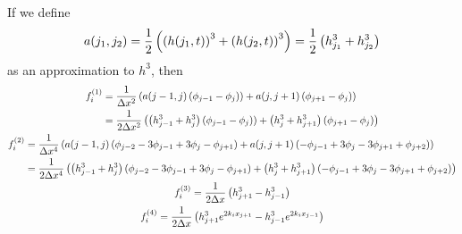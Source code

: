 If we define 
\begin{equation*}
    a\!\left( j_1, j_2 \right) = \frac{1}{2} \left( \left( h\!\left( j_1, t \right) \right)^3 + \left( h\!\left( j_2, t \right) \right)^3 \right) = \frac{1}{2} \left( h_{j_1}^3 + h_{j_2}^3 \right)
\end{equation*}
as an approximation to $h^3$, then 
\begin{gather*}
\begin{aligned}
    f_i^{(1)} &= \frac{1}{\Delta x^2} \left( a\!\left( j-1, j \right)\left( \phi_{j-1} - \phi_{j}) \right) + a\!\left( j, j+1 \right)\left( \phi_{j+1} - \phi_{j} \right) \right)\\
    &= \frac{1}{2\Delta x^2} \left( \left( h_{j-1}^3 + h_{j}^3 \right)\left( \phi_{j-1} - \phi_{j}) \right) + \left( h_{j}^3 + h_{j+1}^3 \right)\left( \phi_{j+1} - \phi_{j} \right) \right)
\end{aligned}\\
\begin{aligned}
    f_i^{(2)} &= \frac{1}{\Delta x^4} \left( a\!\left( j-1, j \right)\left( \phi_{j-2} - 3\phi_{j-1} + 3\phi_{j} - \phi_{j+1} \right) + a\!\left( j, j+1 \right)\left( -\phi_{j-1} + 3\phi_{j} - 3\phi_{j+1} + \phi_{j+2} \right) \right)\\
    &= \frac{1}{2\Delta x^4} \left( \left( h_{j-1}^3 + h_{j}^3 \right) \left( \phi_{j-2} - 3\phi_{j-1} + 3\phi_{j} - \phi_{j+1} \right) + \left( h_{j}^3 + h_{j+1}^3 \right) \left( -\phi_{j-1} + 3\phi_{j} - 3\phi_{j+1} + \phi_{j+2} \right) \right)
\end{aligned}\\
\begin{aligned}
    f_i^{(3)} = \frac{1}{2\Delta x} \left( h_{j+1}^3 - h_{j-1}^3 \right)
\end{aligned}\\
\begin{aligned}
    f_i^{(4)} = \frac{1}{2\Delta x} \left( h_{j+1}^3 e^{2k_ix_{j+1}} - h_{j-1}^3 e^{2k_ix_{j-1}} \right)
\end{aligned}
\end{gather*}
